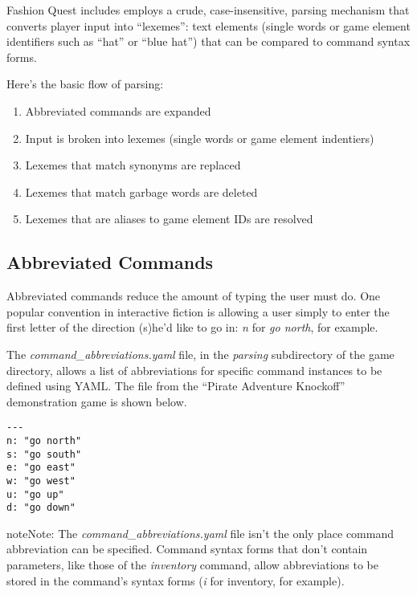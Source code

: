 \documentclass[letterpaper,10pt,english]{manual}
\begin{document}
Fashion Quest includes employs a crude, case-insensitive, parsing mechanism that converts player input into ``lexemes'': text elements (single words or game element identifiers such as ``hat'' or ``blue hat'') that can be compared to command syntax forms.

Here's the basic flow of parsing:
\begin{enumerate}
\item {} 
Abbreviated commands are expanded

\item {} 
Input is broken into lexemes (single words or game element indentiers)

\item {} 
Lexemes that match synonyms are replaced

\item {} 
Lexemes that match garbage words are deleted

\item {} 
Lexemes that are aliases to game element IDs are resolved

\end{enumerate}


\subsection{Abbreviated Commands}

Abbreviated commands reduce the amount of typing the user must do. One popular convention in interactive fiction is allowing a user simply to enter the first letter of the direction (s)he'd like to go in: \emph{n} for \emph{go north}, for example.

The \emph{command\_abbreviations.yaml} file, in the \emph{parsing} subdirectory of the game directory, allows a list of abbreviations for specific command instances to be defined using YAML. The file from the ``Pirate Adventure Knockoff'' demonstration game is shown below.

\begin{Verbatim}[commandchars=@\[\]]
---
n: "go north"
s: "go south"
e: "go east"
w: "go west"
u: "go up"
d: "go down"
\end{Verbatim}

\begin{notice}{note}{Note:}
The \emph{command\_abbreviations.yaml} file isn't the only place command abbreviation can be specified. Command syntax forms that don't contain parameters, like those of the \emph{inventory} command, allow abbreviations to be stored in the command's syntax forms (\emph{i} for inventory, for example).
\end{notice}
\end{document}
